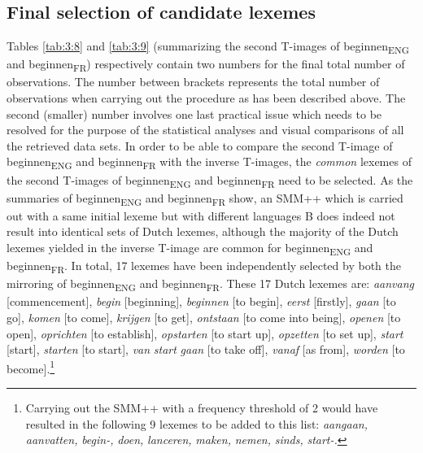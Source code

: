 \subsection{Final selection of candidate lexemes}
\label{sec:3.6.4}  
Tables \ref{tab:3:8} and \ref{tab:3:9} (summarizing the second T-images of beginnen\textsubscript{ENG} and beginnen\textsubscript{FR}) respectively contain two numbers for the final total number of observations. The number between brackets represents the total number of observations when carrying out the procedure as has been described above. The second (smaller) number involves one last practical issue which needs to be resolved for the purpose of the statistical analyses and visual comparisons of all the retrieved data sets. In order to be able to compare the second T-image of beginnen\textsubscript{ENG} and beginnen\textsubscript{FR} with the inverse T-images, the \textit{common} lexemes of the second T-images of beginnen\textsubscript{ENG} and beginnen\textsubscript{FR} need to be selected. As the summaries of beginnen\textsubscript{ENG} and beginnen\textsubscript{FR} show, an SMM++ which is carried out with a same initial lexeme but with different languages B does indeed not result into identical sets of Dutch lexemes, although the majority of the Dutch lexemes yielded in the inverse T-image are common for beginnen\textsubscript{ENG} and beginnen\textsubscript{FR}. In total, 17 lexemes have been independently selected by both the mirroring of beginnen\textsubscript{ENG} and beginnen\textsubscript{FR}. These 17 Dutch lexemes are: \textit{aanvang} [commencement], \textit{begin} [beginning], \textit{beginnen} [to begin], \textit{eerst} [firstly], \textit{gaan} [to go], \textit{komen} [to come], \textit{krijgen} [to get], \textit{ontstaan} [to come into being], \textit{openen} [to open], \textit{oprichten} [to establish], \textit{opstarten} [to start up], \textit{opzetten} [to set up], \textit{start} [start], \textit{starten} [to start], \textit{van} \textit{start} \textit{gaan} [to take off], \textit{vanaf} [as from], \textit{worden} [to become].\footnote{Carrying out the SMM++ with a frequency threshold of 2 would have resulted in the following 9 lexemes to be added to this list: \textit{aangaan,} \textit{aanvatten,} \textit{begin-,} \textit{doen,} \textit{lanceren,} \textit{maken,} \textit{nemen,} \textit{sinds,} \textit{start-.}}


